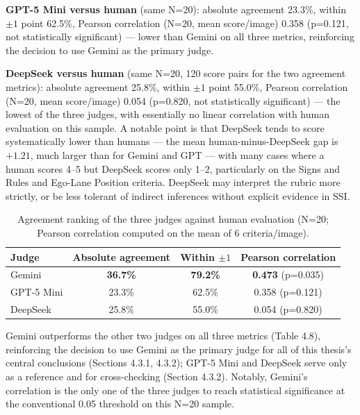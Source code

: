 \documentclass[12pt,a4paper]{report}
\begin{document}
\textbf{GPT-5 Mini versus human} (same N=20): absolute agreement 23.3\%, within $\pm 1$ point 62.5\%, Pearson correlation (N=20, mean score/image) 0.358 (p=0.121, not statistically significant) --- lower than Gemini on all three metrics, reinforcing the decision to use Gemini as the primary judge.

\textbf{DeepSeek versus human} (same N=20, 120 score pairs for the two agreement metrics): absolute agreement 25.8\%, within $\pm 1$ point 55.0\%, Pearson correlation (N=20, mean score/image) 0.054 (p=0.820, not statistically significant) --- the lowest of the three judges, with essentially no linear correlation with human evaluation on this sample. A notable point is that DeepSeek tends to score systematically lower than humans --- the mean human-minus-DeepSeek gap is $+1.21$, much larger than for Gemini and GPT --- with many cases where a human scores 4--5 but DeepSeek scores only 1--2, particularly on the Signs and Rules and Ego-Lane Position criteria. DeepSeek may interpret the rubric more strictly, or be less tolerant of indirect inferences without explicit evidence in SSI.

\begin{table}[htbp]
    \centering
    \small
    \caption[Agreement ranking of the three judges against human evaluation]{Agreement ranking of the three judges against human evaluation (N=20; Pearson correlation computed on the mean of 6 criteria/image).}
    \label{tab:4.8}
    \begin{tabular}{@{}lccc@{}}
        \toprule
        \textbf{Judge} & \textbf{Absolute agreement} & \textbf{Within $\pm 1$} & \textbf{Pearson correlation} \\
        \midrule
        Gemini      & \textbf{36.7\%} & \textbf{79.2\%} & \textbf{0.473} (p=0.035) \\
        GPT-5 Mini  & 23.3\%          & 62.5\%          & 0.358 (p=0.121) \\
        DeepSeek    & 25.8\%          & 55.0\%          & 0.054 (p=0.820) \\
        \bottomrule
    \end{tabular}
\end{table}

Gemini outperforms the other two judges on all three metrics (Table 4.8), reinforcing the decision to use Gemini as the primary judge for all of this thesis's central conclusions (Sections 4.3.1, 4.3.2); GPT-5 Mini and DeepSeek serve only as a reference and for cross-checking (Section 4.3.2). Notably, Gemini's correlation is the only one of the three judges to reach statistical significance at the conventional 0.05 threshold on this N=20 sample.
\end{document}
